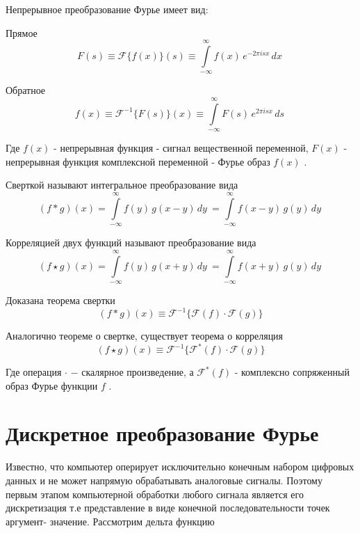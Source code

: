 \documentclass[oneside,final,14pt]{extreport}
\begin{document}
Непрерывное преобразование Фурье имеет вид: 

Прямое
\begin{equation}
F(s) 
\equiv
\mathcal{F}\{f(x)\}(s)
\equiv
{\int\limits_{-\infty}^{\infty}f(x)\,e^{-2\pi i s x}\,dx~}
\end{equation}

Обратное 
\begin{equation}
f(x) 
\equiv
\mathcal{F}^{-1}\{F(s)\}(x)
\equiv
{\int\limits_{-\infty}^{\infty}F(s)\,e^{2\pi i s x}\,ds~}
\end{equation}

Где $f(x)$ - непрерывная функция - сигнал вещественной переменной,
$F(x)$ - непрерывная функция комплексной переменной - Фурье образ $f(x)$ \cite{Gonzalez}. 

Сверткой называют интегральное преобразование вида
\begin{equation}
(f*g)(x)
=
{\int\limits_{-\infty}^{\infty} f(y)\,g(x-y)\,dy~} 
=
{\int\limits_{-\infty}^{\infty} f(x-y)\,g(y)\,dy~}  
\end{equation}

Корреляцией двух функций называют преобразование вида
\begin{equation}
(f \star g)(x) 
= 
{\int\limits_{-\infty}^{\infty} f(y)\,g(x+y)\,dy~} 
= 
{\int\limits_{-\infty}^{\infty} f(x+y)\,g(y)\,dy~}  
\end{equation}

Доказана теорема свертки 
\begin{equation}
{(f*g)(x)}
\equiv
\mathcal{F}^{-1} \{
\mathcal{F}(f) \cdot \mathcal{F}(g) 
\}
\label{correlation_theorem}
\end{equation}

Аналогично теореме о свертке, существует теорема о корреляция 
\begin{equation}
{(f \star g)(x)} 
\equiv
\mathcal{F}^{-1} \{
\mathcal{F}^*(f) \cdot \mathcal{F}(g) 
\}
\end{equation}

Где операция \hspace{3pt} $\cdot$ \hspace{3pt} $-$ скалярное произведение, а $\mathcal{F}^*(f)$ - комплексно сопряженный образ Фурье функции $f$ .

\section{Дискретное преобразование Фурье}
Известно, что компьютер оперирует исключительно конечным набором цифровых данных и не может напрямую обрабатывать аналоговые сигналы. Поэтому первым этапом компьютерной обработки любого сигнала является его дискретизация т.е представление в виде конечной последовательности точек аргумент- значение.
Рассмотрим дельта функцию 
\end{document}
